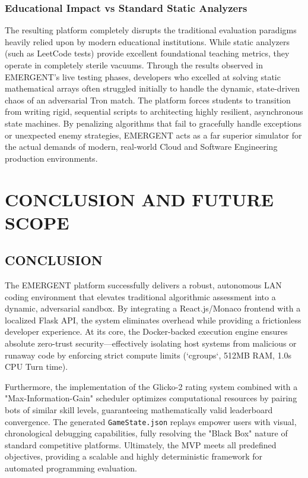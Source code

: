 \documentclass[12pt,a4paper]{report}
\begin{document}
\subsection{Educational Impact vs Standard Static Analyzers}
The resulting platform completely disrupts the traditional evaluation paradigms heavily relied upon by modern educational institutions. While static analyzers (such as LeetCode tests) provide excellent foundational teaching metrics, they operate in completely sterile vacuums. Through the results observed in EMERGENT's live testing phases, developers who excelled at solving static mathematical arrays often struggled initially to handle the dynamic, state-driven chaos of an adversarial Tron match. The platform forces students to transition from writing rigid, sequential scripts to architecting highly resilient, asynchronous state machines. By penalizing algorithms that fail to gracefully handle exceptions or unexpected enemy strategies, EMERGENT acts as a far superior simulator for the actual demands of modern, real-world Cloud and Software Engineering production environments.

\chapter{CONCLUSION AND FUTURE SCOPE}

\section{CONCLUSION}
The EMERGENT platform successfully delivers a robust, autonomous LAN coding environment that elevates traditional algorithmic assessment into a dynamic, adversarial sandbox. By integrating a React.js/Monaco frontend with a localized Flask API, the system eliminates overhead while providing a frictionless developer experience. At its core, the Docker-backed execution engine ensures absolute zero-trust security—effectively isolating host systems from malicious or runaway code by enforcing strict compute limits (`cgroups`, 512MB RAM, 1.0s CPU Turn time).

Furthermore, the implementation of the Glicko-2 rating system combined with a "Max-Information-Gain" scheduler optimizes computational resources by pairing bots of similar skill levels, guaranteeing mathematically valid leaderboard convergence. The generated \texttt{GameState.json} replays empower users with visual, chronological debugging capabilities, fully resolving the "Black Box" nature of standard competitive platforms. Ultimately, the MVP meets all predefined objectives, providing a scalable and highly deterministic framework for automated programming evaluation.
\end{document}
